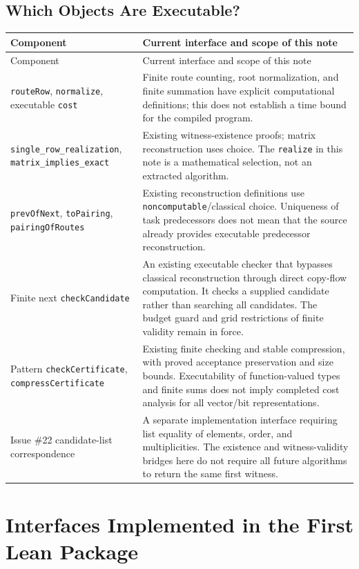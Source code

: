 \documentclass[11pt]{article}
\theoremstyle{remark}
\newcommand{\code}[1]{\nolinkurl{#1}}
\begin{document}
\subsection{Which Objects Are Executable?}
\small
\begin{longtable}{@{}p{}p{}@{}}
\toprule Component & Current interface and scope of this note\\\midrule
\endfirsthead
\toprule Component & Current interface and scope of this note\\\midrule
\endhead
\code{routeRow}, \code{normalize}, executable \code{cost} &
Finite route counting, root normalization, and finite summation have explicit computational definitions; this does not establish a time bound for the compiled program.\\[4pt]
\code{single_row_realization}, \code{matrix_implies_exact} &
Existing witness-existence proofs; matrix reconstruction uses choice.
The \code{realize} in this note is a mathematical selection, not an extracted algorithm.\\[4pt]
\code{prevOfNext}, \code{toPairing}, \code{pairingOfRoutes} &
Existing reconstruction definitions use \code{noncomputable}/classical choice.
Uniqueness of task predecessors does not mean that the source already provides executable predecessor reconstruction.\\[4pt]
Finite next \code{checkCandidate} &
An existing executable checker that bypasses classical reconstruction through direct copy-flow computation. It checks a supplied candidate rather than searching all candidates.
The budget guard and grid restrictions of finite validity remain in force.\\[4pt]
Pattern \code{checkCertificate}, \code{compressCertificate} &
Existing finite checking and stable compression, with proved acceptance preservation and size bounds.
Executability of function-valued types and finite sums does not imply completed cost analysis for all vector/bit representations.\\[4pt]
Issue \#22 candidate-list correspondence &
A separate implementation interface requiring list equality of elements, order, and multiplicities.
The existence and witness-validity bridges here do not require all future algorithms to return the same first witness.\\
\bottomrule
\end{longtable}
\normalsize

\section{Interfaces Implemented in the First Lean Package}
\end{document}
